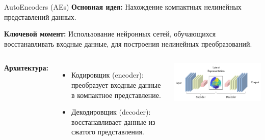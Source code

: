 \begin{frame}[allowframebreaks]{AutoEncoders (AEs)}
    \textbf{Основная идея:} Нахождение компактных нелинейных представлений данных.

    \textbf{Ключевой момент:} Использование нейронных сетей, обучающихся восстанавливать входные данные, для построения нелинейных преобразований.

    \begin{columns}

        \textbf{Архитектура:}
        \begin{itemize}
            \item Кодировщик (encoder): преобразует входные данные в компактное представление.
            \item Декодировщик (decoder): восстанавливает данные из сжатого представления.
        \end{itemize}


        \begin{center}
            \includegraphics[width=1\textwidth]{../resources/methods/autoencoder.png}
        \end{center}
    \end{columns}


\end{frame}
